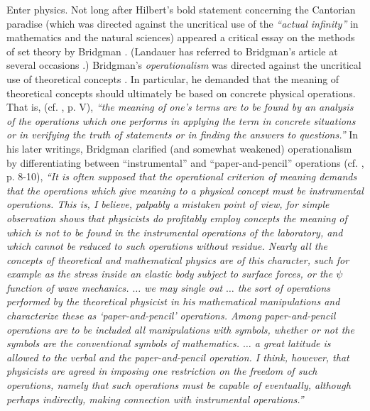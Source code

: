 Enter physics. Not long after Hilbert's bold statement concerning the
Cantorian paradise (which was directed against the uncritical use of the
{\em ``actual infinity''} in mathematics and the natural sciences)
appeared a critical essay on the methods of set theory by Bridgman
\cite{bridgman}. (Landauer has referred to Bridgman's
article
at several occasions \cite{landauer-67,landauer-87,landauer-95}.)
Bridgman's {\em operationalism} was directed against the uncritical use
of theoretical concepts
\cite{bridgman-logic,bridgman-theory}.
 In particular, he demanded that the meaning
of theoretical concepts should ultimately be based on concrete
physical operations. That is,
(cf. \cite{bridgman-reflextions}, p. V),
{\em
``the meaning of one's terms are to be found
by an analysis of the operations which one performs in applying the
term in concrete situations or in verifying the truth of statements or
in finding the answers to questions.''}
In his later writings, Bridgman clarified (and somewhat weakened)
operationalism
by differentiating between ``instrumental'' and ``paper-and-pencil''
operations
(cf. \cite{bridgman-nature}, p. 8-10),
{\em
``It is often supposed that the operational criterion of meaning demands
that the operations which give meaning to a physical concept {\em must}
be instrumental operations. This is, I believe, palpably a mistaken
point of view, for simple observation shows that physicists do
profitably employ concepts the meaning of which is not to be found in
the instrumental operations of the laboratory, and which cannot be
reduced to such operations without residue. Nearly all the concepts of
theoretical and mathematical physics are of this character, such for
example as the stress inside an elastic body subject to surface forces,
or the $\psi$ function of wave mechanics. $\ldots$ we may single out
$\ldots$ the sort of operations performed by the theoretical physicist
in his mathematical manipulations and characterize these as
`paper-and-pencil' operations. Among paper-and-pencil operations are to
be included all manipulations with symbols, whether or not the symbols
are the conventional symbols of mathematics.
$\ldots$
a great latitude is allowed to the verbal and the
paper-and-pencil operation. I think, however, that physicists are agreed
in imposing one restriction on the freedom of such operations, namely
that such operations must be capable of eventually, although perhaps
indirectly, making connection with instrumental operations.''}

